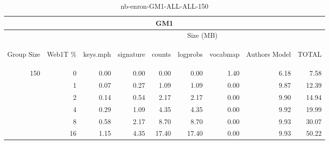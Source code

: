 \begin{center}
\begin{table}[htbp] 
 \begin{center}
\begin{tabular}{ | r | r | r | r | r | r | r | r | r |}
\hline
\multicolumn{9}{|c|}{GM1}\\
\hline
 & & \multicolumn{7}{|c|}{Size (MB)}\\ \cline{3-9}
\begin{sideways}Group Size\end{sideways} & \begin{sideways}Web1T \% \end{sideways} & \begin{sideways}keys.mph\end{sideways} & \begin{sideways}signature\end{sideways} & \begin{sideways}counts\end{sideways} & \begin{sideways}logprobs\end{sideways} & \begin{sideways}vocabmap\end{sideways} & \begin{sideways}Authors Model \end{sideways} & \begin{sideways}TOTAL\end{sideways}\\
\hline
\multirow{5}{*}{150}
 & 0 & 0.00 & 0.00 & 0.00 & 0.00 & 1.40 & 6.18 & 7.58\\ \cline{2-9}
 & 1 & 0.07 & 0.27 & 1.09 & 1.09 & 0.00 & 9.87 & 12.39\\ \cline{2-9}
 & 2 & 0.14 & 0.54 & 2.17 & 2.17 & 0.00 & 9.90 & 14.94\\ \cline{2-9}
 & 4 & 0.29 & 1.09 & 4.35 & 4.35 & 0.00 & 9.92 & 19.99\\ \cline{2-9}
 & 8 & 0.58 & 2.17 & 8.70 & 8.70 & 0.00 & 9.93 & 30.07\\ \cline{2-9}
 & 16 & 1.15 & 4.35 & 17.40 & 17.40 & 0.00 & 9.93 & 50.22\\ \cline{2-9}
\hline
\end{tabular}
\caption{nb-enron-GM1-ALL-ALL-150}
\label{table:nb-enron-GM1-ALL-ALL-150}
\end{center}
 \end{table}
\end{center}

